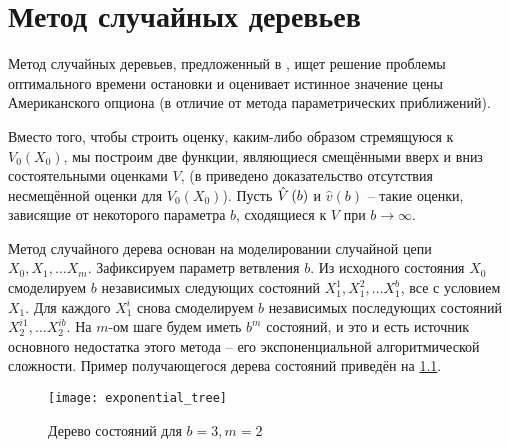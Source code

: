 \chapter{Метод случайных деревьев}\label{chapter:2}

Метод случайных деревьев, предложенный в \cite{Broadie1997}, ищет решение проблемы оптимального времени остановки и оценивает истинное значение цены Американского опциона (в отличие от метода параметрических приближений).

\par Вместо того, чтобы строить оценку, каким-либо образом стремящуюся к $V_0\left(X_0\right)$, мы построим две функции, являющиеся смещёнными вверх и вниз состоятельными оценками $V$, (в \cite{Broadie1997} приведено доказательство отсутствия несмещённой оценки для $V_0\left(X_0\right)$). Пусть $\hat{V}\left(b\right)$ и $\hat{v}\left(b\right)$ -- такие оценки, зависящие от некоторого параметра $b$, сходящиеся к $V$ при $b\to\infty$.
\par Метод случайного дерева основан на моделировании случайной цепи $X_0, X_1, \ldots X_m$. Зафиксируем параметр ветвления $b$. Из исходного состояния $X_0$ смоделируем $b$ независимых следующих состояний $X_1^1, X_1^2, \ldots X_1^b$, все с условием $X_1$. Для каждого $X_1^i$ снова смоделируем $b$ независимых последующих состояний $X_2^{i1}, \ldots X_2^{ib}$. На $m$-ом шаге будем иметь $b^m$ состояний, и это и есть источник основного недостатка этого метода -- его экспоненциальной алгоритмической сложности. Пример получающегося дерева состояний приведён на \ref{fig:exponential_tree}.
\begin{figure}
	\centering
	\texttt{[image: exponential\_tree]}
	\caption{Дерево состояний для $b = 3, m = 2$}
	\label{fig:exponential_tree}
\end{figure}
